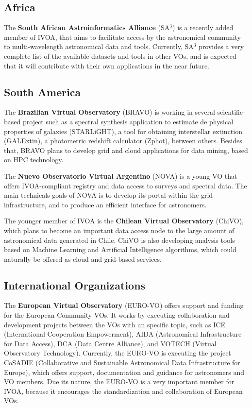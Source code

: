 \subsection{Africa}
The \textbf{South African Astroinformatics Alliance} (SA$^3$) 
is a recently added member of IVOA, that aims 
to facilitate access by the astronomical community to
multi-wavelength astronomical data and tools.
Currently, SA$^3$ provides a very complete list of the available datasets and
tools in other VOs, and is expected that it will contribute with their own
applications in the near future.

\subsection{South America}

The \textbf{Brazilian Virtual Observatory} (BRAVO) is working in several
scientific-based project \cite{CarvalhoXXXX} such as a spectral synthesis 
application to
estimate de physical properties of galaxies (STARLiGHT), a tool 
for obtaining interstellar extinction (GALExtin), a photometric redshift
calculator (Zphot), between others. Besides that, BRAVO plans to develop
grid and cloud applications for data mining, based on HPC technology.

The \textbf{Nuevo Observatorio Virtual Argentino} (NOVA) is a young
VO that offers IVOA-compliant registry and data access to surveys and
spectral data. The main technicals goals of NOVA is to develop its portal
within the grid infrastructure, and to produce an efficient interface for
astronomers.

The younger member of IVOA is the \textbf{Chilean Virtual Observatory} (ChiVO),
which plans to become an important data access node to the large amount
of astronomical data generated in Chile. ChiVO is also developing analysis
tools based on Machine Learning and Artificial Intelligence algorithms,
which could naturally be offered as cloud and grid-based services.

\subsection{International Organizations}

The \textbf{European Virtual Observatory} (EURO-VO) offers support and funding
for the European Community VOs.  It works by executing collaboration and
development projects between the VOs with an specific topic, such as ICE
(International Cooperation Empowerment), %
AIDA (Astronomical Infrastructure for Data Access),%
DCA (Data Centre Alliance), and %
VOTECH (Virtual Observatory Technology). %
Currently, the EURO-VO is executing the project CoSADIE (Collaborative and
Sustainable Astronomical Data Infrastructure for Europe), which offers 
support, documentation and guidance for astronomers and VO members.
Due its nature, the EURO-VO is a very important member for IVOA, because
it encourages the standardization and collaboration of European VOs.

